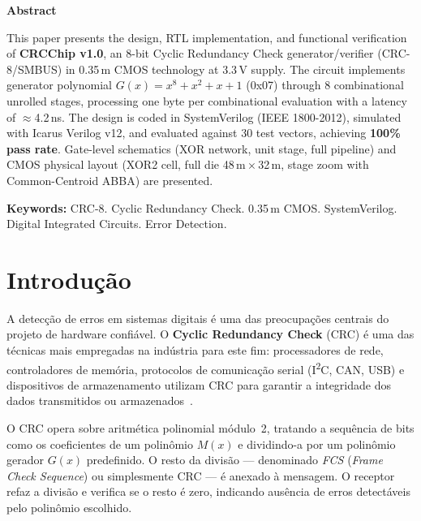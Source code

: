 \documentclass[12pt,a4paper]{article}
\newenvironment{abstractenv}{%
  \begin{center}\textbf{Abstract}\end{center}\small\setlength{\parindent}{0pt}}{}
\begin{document}
\vspace{1.2cm}
\begin{abstractenv}
This paper presents the design, RTL implementation, and functional verification of \textbf{CRCChip v1.0}, an 8-bit Cyclic Redundancy Check generator/verifier (CRC-8/SMBUS) in 0.35\,\textmu m CMOS technology at 3.3\,V supply. The circuit implements generator polynomial $G(x)=x^8+x^2+x+1$ (0x07) through 8 combinational unrolled stages, processing one byte per combinational evaluation with a latency of $\approx$4.2\,ns. The design is coded in SystemVerilog (IEEE 1800-2012), simulated with Icarus Verilog v12, and evaluated against 30 test vectors, achieving \textbf{100\% pass rate}. Gate-level schematics (XOR network, unit stage, full pipeline) and CMOS physical layout (XOR2 cell, full die 48\,\textmu m\,$\times$\,32\,\textmu m, stage zoom with Common-Centroid ABBA) are presented.
\end{abstractenv}

\vspace{0.5cm}
\noindent\textbf{Keywords:} CRC-8. Cyclic Redundancy Check. 0.35\,\textmu m CMOS. SystemVerilog. Digital Integrated Circuits. Error Detection.
\newpage

\tableofcontents\newpage
\listoffigures\newpage
\listoftables\newpage

\section{Introdução}

A detecção de erros em sistemas digitais é uma das preocupações centrais do projeto de hardware confiável. O \textbf{Cyclic Redundancy Check} (CRC) é uma das técnicas mais empregadas na indústria para este fim: processadores de rede, controladores de memória, protocolos de comunicação serial (I\textsuperscript{2}C, CAN, USB) e dispositivos de armazenamento utilizam CRC para garantir a integridade dos dados transmitidos ou armazenados~\cite{crc_koopman}.

O CRC opera sobre aritmética polinomial módulo~2, tratando a sequência de bits como os coeficientes de um polinômio $M(x)$ e dividindo-a por um polinômio gerador $G(x)$ predefinido. O resto da divisão — denominado \textit{FCS} (\textit{Frame Check Sequence}) ou simplesmente CRC — é anexado à mensagem. O receptor refaz a divisão e verifica se o resto é zero, indicando ausência de erros detectáveis pelo polinômio escolhido.
\end{document}

